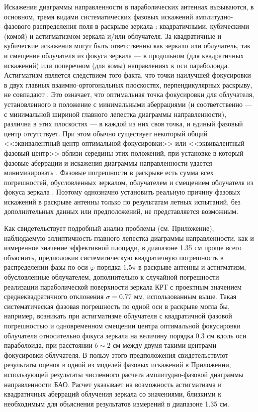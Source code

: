 Искажения диаграммы направленности в параболических антеннах вызываются, в основном, тремя видами
систематических фазовых искажений амплитудно-фазового распределения поля в раскрыве зеркала
\cite{Hansen_1966,Ajzenberg_1977,Christiansen_1972,Galimov_2010}: квадратичными, кубическими (комой)
и астигматизмом зеркала и/или облучателя. За квадратичные и кубические искажения могут быть
ответственны как зеркало или облучатель, так и смещение облучателя из фокуса зеркала --- в
продольном (для квадратичных искажений) или поперечном (для комы) направлениях к оси параболоида.
Астигматизм является следствием того факта, что точки наилучшей фокусировки в двух главных
взаимно-ортогональных плоскостях, перпендикулярных раскрыву, не совпадают \cite{Hansen_1966}. Это
означает, что оптимальная точка фокусировки для облучателя, установленного в положение с
минимальными аберрациями (и соответственно --- с минимальной шириной главного лепестка диаграммы
направленности), различна в этих плоскостях --- в каждой из них своя точка, и единый фазовый центр
отсутствует. При этом обычно существует некоторый общий <<эквивалентный центр оптимальной
фокусировки>> или <<эквивалентный фазовый центр>> вблизи середины этих положений, при установке в
который фазовые аберрации и искажения диаграммы направленности удается минимизировать
\cite{Hansen_1966,Galimov_2010}. Фазовые погрешности в раскрыве есть сумма всех погрешностей,
обусловленных зеркалом, облучателем и смещением облучателя из фокуса зеркала
\cite{Shubarin_1960,Cejtlin_1976}. Поэтому однозначно установить реальную причину фазовых искажений
в раскрыве антенны только по результатам летных испытаний, без дополнительных данных или
предположений, не представляется возможным.

Как свидетельствует подробный анализ проблемы (см. Приложение), наблюдаемую эллиптичность главного
лепестка диаграммы направленности, как и измеренное значение эффективной площади, в диапазоне 1.35
см проще всего объяснить, предположив систематическую квадратичную погрешность в распределении фазы
по оси $\varphi$ порядка $1.5 \pi$ в раскрыве антенны и астигматизм, обусловленные облучателем,
дополнительно к случайной погрешности реализации параболической поверхности зеркала КРТ с проектным
значением среднеквадратичного отклонения $\sigma = 0.77$ мм, использованным выше. Такая
систематическая фазовая погрешность по одной оси в раскрыве могла бы, например, возникать при
астигматизме облучателя с квадратичной фазовой погрешностью и одновременном смещении центра
оптимальной фокусировки облучателя относительно фокуса зеркала на величину порядка 0.3 см вдоль оси
параболоида, при расстоянии $b \sim 2$ см между двумя такими центрами фокусировки облучателя. В
пользу этого предположения свидетельствуют результаты оценок в одной из моделей фазовых искажений в
Приложении, использующей результаты численного расчета \cite{}  амплитудно-фазовой диаграммы
направленности БАО. Расчет \cite{} указывает на возможность астигматизма и квадратичных аберраций
облучения зеркала со значениями, близкими к необходимым для объяснения результатов измерений в
диапазоне 1.35 см.

